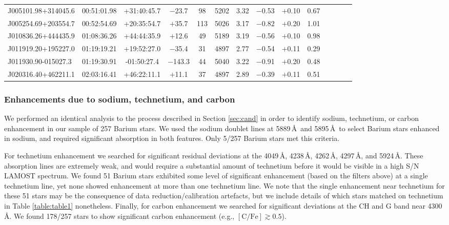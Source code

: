 \documentclass[a4paper,fleqn,usenatbib]{mnras}
\begin{document}
\begin{table}
\begin{tabular}{@{}|l|l|c|c|c|c|c|c|c|c|c|c|c|c|@{}}
J005101.98+314045.6 & 00:51:01.98 & +31:40:45.7 & $-$23.7    & 98  & 5202 & 3.32  & $-$0.53      & $+$0.10      & 0.67 \\
J005254.69+203554.7 & 00:52:54.69 & +20:35:54.7 & $+$35.7     & 113 & 5026 & 3.17  & $-$0.82     & $+$0.20      & 1.01 \\
J010836.26+444435.9 & 01:08:36.26 & +44:44:35.9 & $+$12.6     & 49  & 5189 & 3.19  & $-$0.56     & $+$0.10      & 0.98 \\
J011919.20+195227.0 & 01:19:19.21 & +19:52:27.0 & $-$35.4    & 31  & 4897 & 2.77  & $-$0.54      & $+$0.11      & 0.29 \\
J011930.90-015027.3 & 01:19:30.91 & -01:50:27.4 & $-$143.3   & 44  & 5040 & 3.22  & $-$0.91      & $+$0.20      & 0.48 \\
J020316.40+462211.1 & 02:03:16.41 & +46:22:11.1 & $+$11.1     & 37  & 4897 & 2.89  & $-$0.39     & $+$0.11      & 0.51 \\ \bottomrule
\end{tabular}
\end{table}


\subsubsection{Enhancements due to sodium, technetium, and carbon}
We performed an identical analysis to the process described in Section \ref{sec:cand} in order to identify sodium, technetium, or carbon enhancement in our sample of 257 Barium stars. We used the sodium doublet lines at 5889\,\AA\ and 5895\,\AA\ to select Barium stars enhanced in sodium, and required significant absorption in both features. Only 5/257 Barium stars met this criteria.

For technetium enhancement we searched for significant residual deviations at the 4049\,\AA, 4238\,\AA, 4262\,\AA, 4297\,\AA, and 5924\,\AA. These absorption lines are extremely weak, and would require a substantial amount of technetium before it would be visible in a high S/N LAMOST spectrum. We found 51 Barium stars exhibited some level of significant enhancement (based on the filters above) at a single technetium line, yet none showed enhancement at more than one technetium line. We note that the single enhancement near technetium for these 51 stars may be the consequence of data reduction/calibration artefacts, but we include details of which stars matched on technetium in Table \ref{table:table1} nonetheless.
Finally, for carbon enhancement we searched for significant deviations at the CH and G band near 4300\,\AA. We found 178/257 stars to show significant carbon enhancement (e.g., $[\textrm{C/Fe}] \gtrsim 0.5$).
\end{document}
